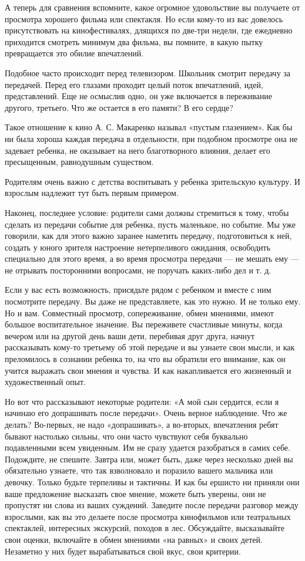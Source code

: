 \documentclass[12pt, a4paper, openany]{book}
\begin{document}
А теперь для сравнения вспомните, какое огромное удовольствие вы получаете от просмотра хорошего фильма или спектакля. Но если кому-то из вас довелось присутствовать на кинофестивалях, длящихся по две-три недели, где ежедневно приходится смотреть минимум два фильма, вы помните, в какую пытку превращается это обилие впечатлений. 

Подобное часто происходит перед телевизором. Школьник смотрит передачу за передачей. Перед его глазами проходит целый поток впечатлений, идей, представлений. Еще не осмыслив одно, он уже включается в переживание другого, третьего. Что же остается в его памяти? В его сердце? 

Такое отношение к кино А. С. Макаренко называл «пустым глазением». Как бы ни была хороша каждая передача в отдельности, при подобном просмотре она не задевает ребенка, не оказывает на него благотворного влияния, делает его пресыщенным, равнодушным существом. 

Родителям очень важно с детства воспитывать у ребенка зрительскую культуру. И взрослым надлежит тут быть первым примером. 

Наконец, последнее условие: родители сами должны стремиться к тому, чтобы сделать из передачи событие для ребенка, пусть маленькое, но событие. Мы уже говорили, как для этого важно заранее наметить передачу, подготовиться к ней, создать у юного зрителя настроение нетерпеливого ожидания, освободить специально для этого время, а во время просмотра передачи — не мешать ему — не отрывать посторонними вопросами, не поручать каких-либо дел и т. д. 

Если у вас есть возможность, присядьте рядом с ребенком и вместе с ним посмотрите передачу. Вы даже не представляете, как это нужно. И не только ему. Но и вам. Совместный просмотр, сопереживание, обмен мнениями, имеют большое воспитательное значение. Вы переживете счастливые минуты, когда вечером или на другой день ваши дети, перебивая друг друга, начнут рассказывать кому-то третьему об этой передаче и вы узнаете свои мысли, и как преломилось в сознании ребенка то, на что вы обратили его внимание, как он учится выражать свои мнения и чувства. И как накапливается его жизненный и художественный опыт. 

Но вот что рассказывают некоторые родители: «А мой сын сердится, если я начинаю его допрашивать после передачи». Очень верное наблюдение. Что же делать? Во-первых, не надо «допрашивать», а во-вторых, впечатления ребят бывают настолько сильны, что они часто чувствуют себя буквально подавленными всем увиденным. Им не сразу удается разобраться в самих себе. Подождите, не спешите. Завтра или, может быть, даже через несколько дней вы обязательно узнаете, что так взволновало и поразило вашего мальчика или девочку. Только будьте терпеливы и тактичны. И как бы ершисто ни приняли они ваше предложение высказать свое мнение, можете быть уверены, они не пропустят ни слова из ваших суждений. Заведите после передачи разговор между взрослыми, как вы это делаете после просмотра кинофильмов или театральных спектаклей, интересных экскурсий, походов в лес. Обсуждайте, высказывайте свои оценки, включайте в обмен мнениями «на равных» и своих детей. Незаметно у них будет вырабатываться свой вкус, свои критерии. 
\end{document}
